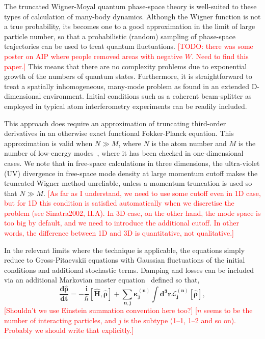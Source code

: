 \documentclass[aps,prl,twocolumn,showpacs,amsmath,amssymb,superscriptaddress]{revtex4-1}
\newcommand{\remark}[1]{\textcolor{red}{{[}#1{]}}}
\begin{document}
{The truncated Wigner-Moyal quantum phase-space theory is well-suited
to these types of calculation of many-body dynamics.
Although the Wigner function is not a true probability,
its becomes one to a good approximation in the limit of large particle number,
so that a probabilistic (random) sampling of phase-space trajectories
can be used to treat quantum fluctuations.
	\remark{TODO: there was some poster on AIP where people removed areas with negative $W$.
	Need to find this paper.}
This means that there are no complexity problems due to exponential growth
of the numbers of quantum states.
Furthermore, it is straightforward to treat a spatially inhomogeneous,
many-mode problem as found in an extended D-dimensional environment.
Initial conditions such as a coherent beam-splitter
as employed in typical atom interferometry experiments can be readily included.

This approach does require an approximation of truncating third-order derivatives
in an otherwise exact functional Fokker-Planck equation.
This approximation is valid when $N \gg M$, where $N$ is the atom number and
$M$ is the number of low-energy modes~\cite{Drummond1993,Sinatra2002,Norrie2006},
where it has been checked in one-dimensional cases.
We note that in free-space calculations in three dimensions,
the ultra-violet (UV) divergence in free-space mode density at large momentum cutoff
makes the truncated Wigner method unreliable,
unless a momentum truncation is used so that $N \gg M$.
	\remark{As far as I understand, we need to use some cutoff even in 1D case,
	but for 1D this condition is satisfied automatically when we discretise the problem
	(see Sinatra2002, II.A).
	In 3D case, on the other hand, the mode space is too big by default,
	and we need to introduce the additional cutoff.
	In other words, the difference between 1D and 3D is quantitative, not qualitative.}

In the relevant limits where the technique is applicable,
the equations simply reduce to Gross-Pitaevskii equations with Gaussian fluctuations
of the initial conditions and additional stochastic terms.
Damping and losses can be included via an additional Markovian master equation~\cite{Jack2002}
defined so that,
\begin{equation}
\bm{
	\frac{d\hat{\rho}}{dt} = -\frac{i}{\hbar} \left[ \hat{H}, \hat{\rho} \right] +
	\sum_{n,\mathbf{j}} \kappa_{\mathbf{j}}^{(n)}
	\int d^{3}\mathbf{r}\mathcal{L}_{\mathbf{j}}^{(n)} \left[ \hat{\rho} \right],
}
\end{equation}
	\remark{Shouldn't we use Einstein summation convention here too?}
	\remark{$n$ seems to be the number of interacting particles,
	and $j$ is the subtype (1--1, 1--2 and so on).
	Probably we should write that explicitly.}

}
\end{document}

